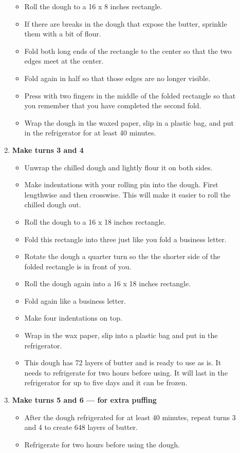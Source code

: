 \documentclass[11pt,letterpaper]{article}
\newcommand \fileName {PuffPastry}
\begin{document}
\begin{description}
\begin{enumerate}
\begin{itemize}
	\item Roll the dough to a 16 x 8 inches rectangle.
	\item If there are breaks in the dough that expose the butter, sprinkle them with a bit of flour.
	\item Fold both long ends of the rectangle to the center so that the two edges meet at the center.
	\item Fold again in half so that those edges are no longer visible.
	\item Press with two fingers in the middle of the folded rectangle so that you remember that you have completed the second fold.
	\item Wrap the dough in the waxed paper, slip in a plastic bag, and put in the refrigerator for at least 40 minutes.
	\end{itemize}
	\item {\bf Make turns 3 and 4}
	\begin{itemize}
	\item Unwrap the chilled dough and lightly flour it on both sides.
	\item Make indentations with your rolling pin into the dough. First lengthwise and then crosswise. This will make it easier to roll the chilled dough out. 
	\item Roll the dough to a 16 x 18 inches rectangle. 
	\item Fold this rectangle into three just like you fold a business letter.
	\item Rotate the dough a quarter turn so the the shorter side of the folded rectangle is in front of you.
	\item Roll the dough again into a 16 x 18 inches rectangle.
	\item Fold again like a business letter.
	\item Make four indentations on top.
	\item Wrap in the wax paper, slip into a plastic bag and put in the refrigerator.
	\item This dough has 72 layers of butter and is ready to use as is. It needs to refrigerate for two hours before using. It will last in the refrigerator for up to five days and it can be frozen.
	\end{itemize}
	\item {\bf Make turns 5 and 6 --- for extra puffing}
	\begin{itemize}
	\item After the dough refrigerated for at least 40 minutes, repeat turns 3 and 4 to create 648 layers of butter.
	\item Refrigerate for two hours before using the dough.
	\end{itemize}
	\end{enumerate}
\end{description}


\end{document}
